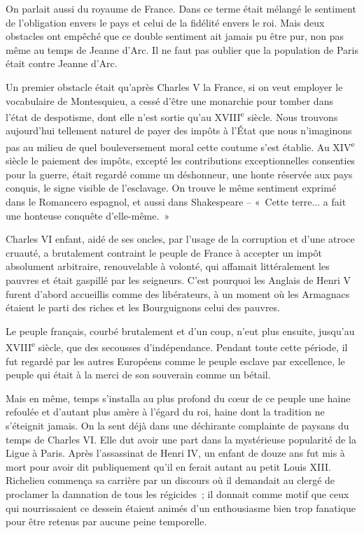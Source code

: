 \documentclass[french,twoside]{book} %
\begin{document}
On parlait aussi du royaume de France. Dans ce terme était mélangé le sentiment de l'obligation envers le pays et celui de la fidélité envers le roi. Mais deux obstacles ont empêché que ce double sentiment ait jamais pu être pur, non pas même au temps de Jeanne d'Arc. Il ne faut pas oublier que la population de Paris était contre Jeanne d'Arc.\par
Un premier obstacle était qu'après Charles V la France, si on veut employer le vocabulaire de Montesquieu, a cessé d'être une monarchie pour tomber dans l'état de despotisme, dont elle n'est sortie qu'au XVIII\textsuperscript{e} siècle. Nous trouvons aujourd'hui tellement naturel de payer des impôts à l'État que nous n'imaginons pas au milieu de quel bouleversement moral cette coutume s'est établie. Au XIV\textsuperscript{e} siècle le paiement des impôts, excepté les contributions exceptionnelles consenties pour la guerre, était regardé comme un déshonneur, une honte réservée aux pays conquis, le signe visible de l'esclavage. On trouve le même sentiment exprimé dans le Romancero espagnol, et aussi dans Shakespeare – « Cette terre... a fait une honteuse conquête d'elle-même. »\par
Charles VI enfant, aidé de ses oncles, par l'usage de la corruption et d'une atroce cruauté, a brutalement contraint le peuple de France à accepter un impôt absolument arbitraire, renouvelable à volonté, qui affamait littéralement les pauvres et était gaspillé par les seigneurs. C'est pourquoi les Anglais de Henri V furent d'abord accueillis comme des libérateurs, à un moment où les Armagnacs étaient le parti des riches et les Bourguignons celui des pauvres.\par
Le peuple français, courbé brutalement et d'un coup, n'eut plus ensuite, jusqu'au XVIII\textsuperscript{e} siècle, que des secousses d'indépendance. Pendant toute cette période, il fut regardé par les autres Européens comme le peuple esclave par excellence, le peuple qui était à la merci de son souverain comme un bétail.\par
Mais en même, temps s'installa au plus profond du cœur de ce peuple une haine refoulée et d'autant plus amère à l'égard du roi, haine dont la tradition ne s'éteignit jamais. On la sent déjà dans une déchirante complainte de paysans du temps de Charles VI. Elle dut avoir une part dans la mystérieuse popularité de la Ligue à Paris. Après l'assassinat de Henri IV, un enfant de douze ans fut mis à mort pour avoir dit publiquement qu'il en ferait autant au petit Louis XIII. Richelieu commença sa carrière par un discours où il demandait au clergé de proclamer la damnation de tous les régicides ; il donnait comme motif que ceux qui nourrissaient ce dessein étaient animés d'un enthousiasme bien trop fanatique pour être retenus par aucune peine temporelle.\par
\end{document}

